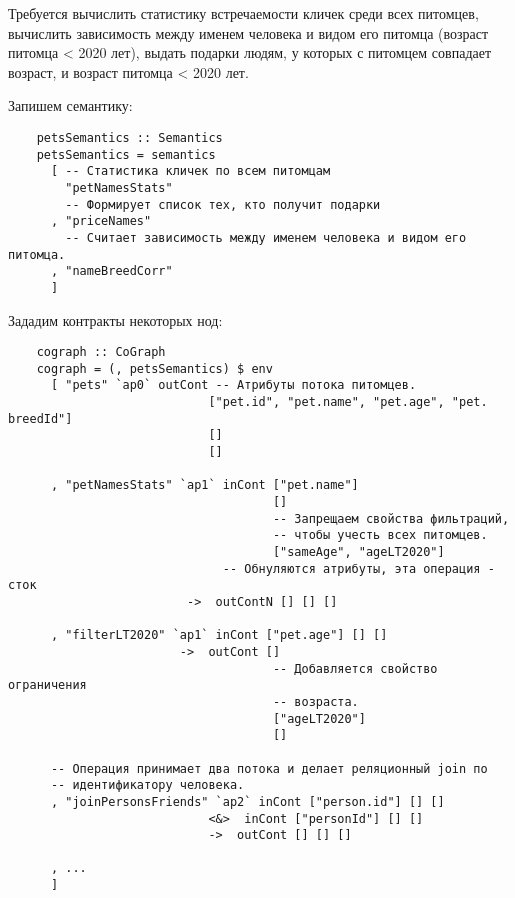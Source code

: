 Требуется вычислить статистику встречаемости кличек среди всех питомцев, вычислить зависимость между именем человека и видом его питомца (возраст питомца < 2020 лет), выдать подарки людям, у которых с питомцем совпадает возраст, и возраст питомца < 2020 лет.

Запишем семантику:
\begin{lstlisting}
    petsSemantics :: Semantics
    petsSemantics = semantics
      [ -- Статистика кличек по всем питомцам
        "petNamesStats"
        -- Формирует список тех, кто получит подарки
      , "priceNames"
        -- Считает зависимость между именем человека и видом его питомца.
      , "nameBreedCorr"
      ]
\end{lstlisting}

Зададим контракты некоторых нод:
\begin{lstlisting}
    cograph :: CoGraph
    cograph = (, petsSemantics) $ env
      [ "pets" `ap0` outCont -- Атрибуты потока питомцев.
                            ["pet.id", "pet.name", "pet.age", "pet.  breedId"]
                            []
                            []

      , "petNamesStats" `ap1` inCont ["pet.name"]
                                     []
                                     -- Запрещаем свойства фильтраций,
                                     -- чтобы учесть всех питомцев.
                                     ["sameAge", "ageLT2020"]
                              -- Обнуляются атрибуты, эта операция -   сток
                         ->  outContN [] [] []

      , "filterLT2020" `ap1` inCont ["pet.age"] [] []
                        ->  outCont []
                                     -- Добавляется свойство ограничения
                                     -- возраста.
                                     ["ageLT2020"]
                                     []

      -- Операция принимает два потока и делает реляционный join по
      -- идентификатору человека.
      , "joinPersonsFriends" `ap2` inCont ["person.id"] [] []
                            <&>  inCont ["personId"] [] []
                            ->  outCont [] [] []

      , ...
      ]
\end{lstlisting}
